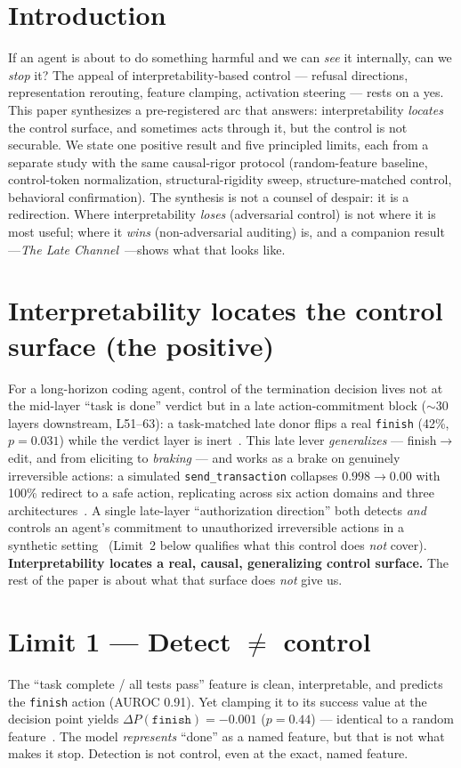 \documentclass[11pt]{article}
\begin{document}
\section{Introduction}
If an agent is about to do something harmful and we can \emph{see} it internally, can we \emph{stop} it? The
appeal of interpretability-based control --- refusal directions, representation rerouting, feature clamping,
activation steering --- rests on a yes. This paper synthesizes a pre-registered arc that answers: interpretability
\emph{locates} the control surface, and sometimes acts through it, but the control is not securable. We state one
positive result and five principled limits, each from a separate study with the same causal-rigor protocol
(random-feature baseline, control-token normalization, structural-rigidity sweep, structure-matched control,
behavioral confirmation). The synthesis is not a counsel of despair: it is a redirection. Where interpretability
\emph{loses} (adversarial control) is not where it is most useful; where it \emph{wins} (non-adversarial auditing)
is, and a companion result---\emph{The Late Channel}~\cite{latechannel}---shows what that looks like.

\section{Interpretability locates the control surface (the positive)}
For a long-horizon coding agent, control of the termination decision lives not at the mid-layer ``task is done''
verdict but in a late action-commitment block ($\sim$30 layers downstream, L51--63): a task-matched late donor
flips a real \texttt{finish} (42\%, $p{=}0.031$) while the verdict layer is inert~\cite{leverlate}. This late lever
\emph{generalizes} --- finish$\to$edit, and from eliciting to \emph{braking} --- and works as a brake on genuinely
irreversible actions: a simulated \texttt{send\_transaction} collapses $0.998\to0.00$ with 100\% redirect to a safe
action, replicating across six action domains and three architectures~\cite{levergen,brake}. A single late-layer
``authorization direction'' both detects \emph{and} controls an agent's commitment to unauthorized irreversible
actions in a synthetic setting~\cite{authdir} (Limit~2 below qualifies what this control does \emph{not} cover). \textbf{Interpretability locates a real, causal, generalizing control surface.} The rest
of the paper is about what that surface does \emph{not} give us.

\section{Limit 1 --- Detect $\neq$ control}
The ``task complete / all tests pass'' feature is clean, interpretable, and predicts the \texttt{finish} action
(AUROC 0.91). Yet clamping it to its success value at the decision point yields $\Delta P(\texttt{finish}) =
-0.001$ ($p{=}0.44$) --- identical to a random feature~\cite{verdict}. The model \emph{represents} ``done'' as a
named feature, but that is not what makes it stop. Detection is not control, even at the exact, named feature.
\end{document}
